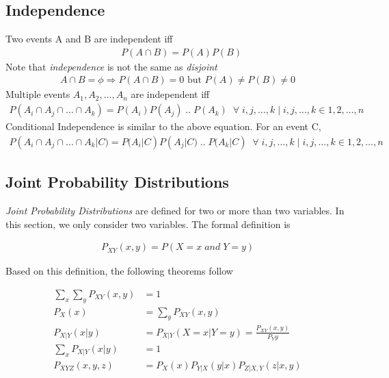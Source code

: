 \documentclass[../probability-notes.tex]{subfiles}
\begin{document}
    \subsection{Independence}
    Two events A and B are independent iff
    \begin{align*}
        &P(A \cap B) = P(A) P(B)
    \end{align*}
    Note that \emph{independence} is not the same as \emph{disjoint}
    \begin{align*}
    A \cap B = \phi \Rightarrow P(A \cap B) = 0 \text{ but } P(A) \neq P(B) \neq 0
    \end{align*}
    Multiple events $A_{1}, A_{2}, \ldots , A_{n}$ are independent iff
    \begin{align*}
        P(A_{i} \cap A_{j} \cap \ldots \cap A_{k}) = P(A_{i}) P(A_{j}) \;..\; P(A_{k}) \;\;\forall\;i,j,\ldots,k \;|\; i,j,\ldots,k \in {1,2,\ldots,n}
    \end{align*}
    Conditional Independence is similar to the above equation. For an event C,
    \begin{align*}
        P(A_{i} \cap A_{j} \cap \ldots \cap A_{k} | C) = P(A_{i}|C) P(A_{j}|C) \;..\; P(A_{k}|C) \;\;\forall\;i,j,\ldots,k \;|\; i,j,\ldots,k \in {1,2,\ldots,n}
    \end{align*}
    
    \subsection{Joint Probability Distributions}
    \emph{Joint Probability Distributions} are defined for two or more than two variables. In this section, we only consider two variables. The formal definition is

    \begin{align*}
        P_{XY}(x, y) = P(X = x \;and\; Y = y)
    \end{align*}

    Based on this definition, the following theorems follow

    \begin{align*}
        \sum_{x} \sum_{y} P_{XY}(x,y) &= 1 \\
        P_{X}(x) &= \sum_{y} P_{XY}(x,y) \tag*{Marginal Probability} \\
        P_{X|Y}(x|y) &= P_{X|Y}(X=x|Y=y) = \frac{P_{XY}(x,y)}{P_{Y}{y}} \\
        \sum_{x} P_{X|Y}(x|y) &= 1 \tag*{Since Y is fixed and we sum over all X's} \\
        P_{XYZ}(x,y,z) &= P_{X}(x) P_{Y|X}(y|x) P_{Z|X,Y}(z|x,y) \tag*{Chain Rule}
    \end{align*}
\end{document}
